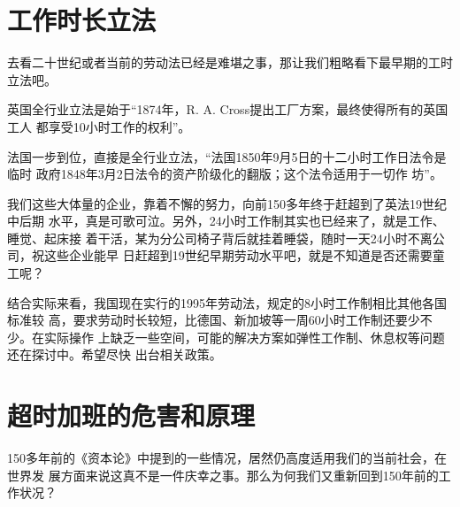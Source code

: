 \section{工作时长立法}

去看二十世纪或者当前的劳动法已经是难堪之事，那让我们粗略看下最早期的工时立法吧。

英国全行业立法是始于“1874年，R. A. Cross提出工厂方案，最终使得所有的英国工人
都享受10小时工作的权利”\cite[96]{britishworkday}。

法国一步到位，直接是全行业立法，“法国1850年9月5日的十二小时工作日法令是临时
政府1848年3月2日法令的资产阶级化的翻版；这个法令适用于一切作
坊”\cite[319]{capital}。

我们这些大体量的企业，靠着不懈的努力，向前150多年终于赶超到了英法19世纪中后期
水平，真是可歌可泣。另外，24小时工作制其实也已经来了，就是工作、睡觉、起床接
着干活，某为分公司椅子背后就挂着睡袋，随时一天24小时不离公司，祝这些企业能早
日赶超到19世纪早期劳动水平吧，就是不知道是否还需要童工呢？

结合实际来看，我国现在实行的1995年劳动法，规定的8小时工作制相比其他各国标准较
高，要求劳动时长较短，比德国、新加坡等一周60小时工作制还要少不少。在实际操作
上缺乏一些空间，可能的解决方案如弹性工作制、休息权等问题还在探讨中。希望尽快
出台相关政策。

\section{超时加班的危害和原理}
\label{sec:gzryuanli}

150多年前的《资本论》中提到的一些情况，居然仍高度适用我们的当前社会，在世界发
展方面来说这真不是一件庆幸之事。那么为何我们又重新回到150年前的工作状况？


